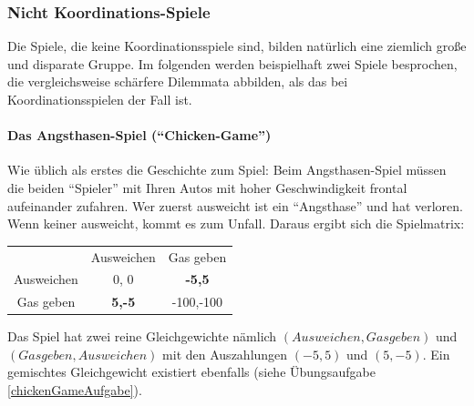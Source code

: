 \subsubsection{Nicht Koordinations-Spiele}

Die Spiele, die keine Koordinationsspiele sind, bilden natürlich eine ziemlich
große und disparate Gruppe. Im folgenden werden beispielhaft zwei Spiele
besprochen, die vergleichsweise schärfere Dilemmata abbilden, als das bei
Koordinationsspielen der Fall ist.

\paragraph{Das Angsthasen-Spiel ("`Chicken-Game"')} 

Wie üblich als erstes die Geschichte zum Spiel: Beim Angsthasen-Spiel müssen
die beiden "`Spieler"' mit Ihren Autos mit hoher Geschwindigkeit frontal
aufeinander zufahren. Wer zuerst ausweicht ist ein "`Angsthase"' und hat verloren.
Wenn keiner ausweicht, kommt es zum Unfall. Daraus ergibt sich die Spielmatrix:

\begin{center}
\begin{tabular}{c|c|c|}
\multicolumn{1}{c}{} & \multicolumn{1}{c}{Ausweichen} &
                               \multicolumn{1}{c}{Gas geben } \\ \cline{2-3} 
Ausweichen               & 0, 0           & {\bf -5,5}      
\\ \cline{2-3} 
Gas geben                & {\bf 5,-5}     & -100,-100
\\ \cline{2-3}
\end{tabular}
\end{center}

Das Spiel hat zwei reine Gleichgewichte nämlich $(Ausweichen, Gas geben)$ und
$(Gas geben, Ausweichen)$ mit den Auszahlungen $(-5,5)$ und $(5,-5)$. Ein
gemischtes Gleichgewicht existiert ebenfalls (siehe Übungsaufgabe
\ref{chickenGameAufgabe}).


